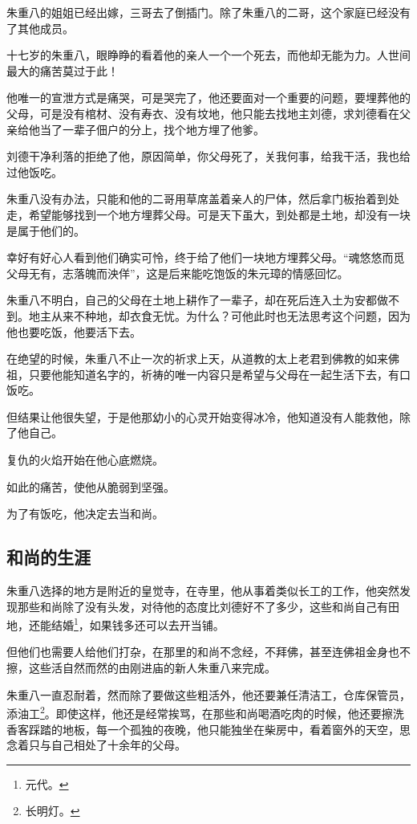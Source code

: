 \begin{multicols}{\theparacolNo}
		朱重八的姐姐已经出嫁，三哥去了倒插门。除了朱重八的二哥，这个家庭已经没有了其他成员。

		十七岁的朱重八，眼睁睁的看着他的亲人一个一个死去，而他却无能为力。人世间最大的痛苦莫过于此！

		他唯一的宣泄方式是痛哭，可是哭完了，他还要面对一个重要的问题，要埋葬他的父母，可是没有棺材、没有寿衣、没有坟地，他只能去找地主刘德，求刘德看在父亲给他当了一辈子佃户的分上，找个地方埋了他爹。

		刘德干净利落的拒绝了他，原因简单，你父母死了，关我何事，给我干活，我也给过他饭吃。

		朱重八没有办法，只能和他的二哥用草席盖着亲人的尸体，然后拿门板抬着到处走，希望能够找到一个地方埋葬父母。可是天下虽大，到处都是土地，却没有一块是属于他们的。

		幸好有好心人看到他们确实可怜，终于给了他们一块地方埋葬父母。“魂悠悠而觅父母无有，志落魄而泱佯”，这是后来能吃饱饭的朱元璋的情感回忆。

		朱重八不明白，自己的父母在土地上耕作了一辈子，却在死后连入土为安都做不到。地主从来不种地，却衣食无忧。为什么？可他此时也无法思考这个问题，因为他也要吃饭，他要活下去。

		在绝望的时候，朱重八不止一次的祈求上天，从道教的太上老君到佛教的如来佛祖，只要他能知道名字的，祈祷的唯一内容只是希望与父母在一起生活下去，有口饭吃。

		但结果让他很失望，于是他那幼小的心灵开始变得冰冷，他知道没有人能救他，除了他自己。

		复仇的火焰开始在他心底燃烧。

		如此的痛苦，使他从脆弱到坚强。

		为了有饭吃，他决定去当和尚。

		\subsection{和尚的生涯}
		朱重八选择的地方是附近的皇觉寺，在寺里，他从事着类似长工的工作，他突然发现那些和尚除了没有头发，对待他的态度比刘德好不了多少，这些和尚自己有田地，还能结婚\footnote{元代。}，如果钱多还可以去开当铺。

		但他们也需要人给他们打杂，在那里的和尚不念经，不拜佛，甚至连佛祖金身也不擦，这些活自然而然的由刚进庙的新人朱重八来完成。

		朱重八一直忍耐着，然而除了要做这些粗活外，他还要兼任清洁工，仓库保管员，添油工\footnote{长明灯。}。即使这样，他还是经常挨骂，在那些和尚喝酒吃肉的时候，他还要擦洗香客踩踏的地板，每一个孤独的夜晚，他只能独坐在柴房中，看着窗外的天空，思念着只与自己相处了十余年的父母。


\end{multicols}
